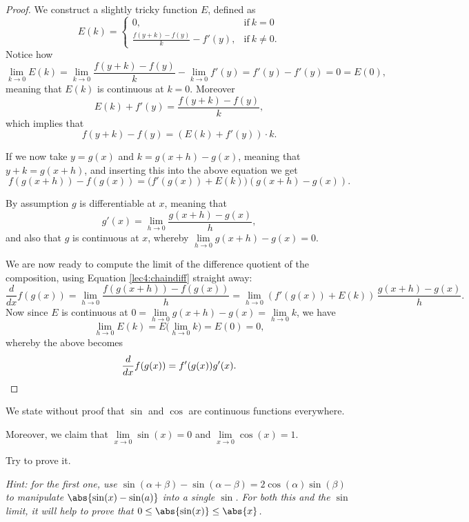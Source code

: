 \begin{proof}
	We construct a slightly tricky function $E$, defined as
	\[
		E(k) = \begin{cases}
		0, & \text{if}~ k = 0 \\
		\frac{f(y + k) - f(y)}{k} - f'(y), & \text{if}~ k \neq 0.
		\end{cases}
	\]
	Notice how
	\[
		\lim_{k \to 0} E(k) = \lim_{k \to 0} \frac{f(y + k) - f(y)}{k} - \lim_{k \to 0} f'(y) = f'(y) - f'(y) = 0 = E(0),
	\]
	meaning that $E(k)$ is continuous at $k = 0$. Moreover
	\[
		E(k) + f'(y) = \frac{f(y + k) - f(y)}{k},
	\]
	which implies that
	\[
		f(y + k) - f(y) = (E(k) + f'(y)) \cdot k.
	\]

	\noindent
	If we now take $y = g(x)$ and $k = g(x + h) - g(x)$, meaning that $y + k = g(x + h)$, and inserting this into the above equation we get
	\begin{equation}\label{lec4:chaindiff}
		f(g(x + h)) - f(g(x)) = \big (f'(g(x)) + E(k) \big ) (g(x + h) - g(x)).
	\end{equation}

	\noindent
	By assumption $g$ is differentiable at $x$, meaning that
	\[
		g'(x) = \lim_{h \to 0} \frac{g(x + h) - g(x)}{h},
	\]
	and also that $g$ is continuous at $x$, whereby $\lim\limits_{h \to 0} g(x + h) - g(x) = 0$.

	We are now ready to compute the limit of the difference quotient of the composition, using Equation \ref{lec4:chaindiff} straight away:
	\[
		\frac{d}{d x} f(g(x)) = \lim_{h \to 0} \frac{f(g(x + h)) - f(g(x))}{h} = \lim_{h \to 0} (f'(g(x)) + E(k)) \, \frac{g(x + h) - g(x)}{h}.
	\]
	Now since $E$ is continuous at $0 = \lim\limits_{h \to 0} g(x + h) - g(x) = \lim\limits_{h \to 0} k$, we have
	\[
		\lim_{h \to 0} E(k) = E \Big ( \lim_{h \to 0} k \Big ) = E(0) = 0,
	\]
	whereby the above becomes
	\[
		\frac{d}{d x} f(g(x)) = f'(g(x)) g'(x). \qedhere
	\]
\end{proof}


We state without proof that $\sin$ and $\cos$ are continuous functions everywhere.

Moreover, we claim that $\lim\limits_{x \to 0} \sin(x) = 0$ and $\lim\limits_{x \to 0} \cos(x) = 1$.

\begin{exercise}
	Try to prove it.

	\emph{Hint: for the first one, use $\sin(\alpha + \beta) - \sin(\alpha - \beta) = 2 \cos(\alpha)\sin(\beta)$ to manipulate $\abs{\sin(x) - \sin(a)}$ into a single $\sin$. For both this and the $\sin$ limit, it will help to prove that $0 \leq \abs{\sin(x)} \leq \abs{x}$.}
\end{exercise}

